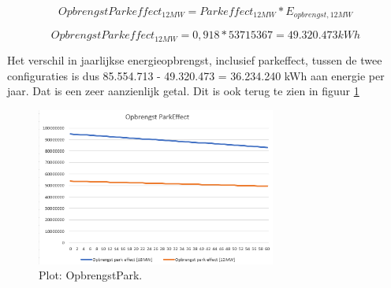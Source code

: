\begin{equation} \label{eq:16}
OpbrengstParkeffect_{12MW}=Parkeffect_{12MW}*E_{opbrengst,12MW}
\end{equation}

\begin{equation} \label{eq:17}
OpbrengstParkeffect_{12MW}= 0,918*53715367 = 49.320.473 kWh
\end{equation}

Het verschil in jaarlijkse energieopbrengst, inclusief parkeffect, tussen de twee configuraties is dus 85.554.713 - 49.320.473 = 36.234.240 kWh aan energie per jaar. Dat is een zeer aanzienlijk getal. Dit is ook terug te zien in figuur \ref{fig:OpbrengstPark}

\begin{figure}[H]
\centering
\includegraphics[width=0.7\textwidth]{IMG/data/overzicht/OpbrengstPark_graph.PNG}
\caption{Plot: OpbrengstPark.}
\label{fig:OpbrengstPark}
\end{figure}
